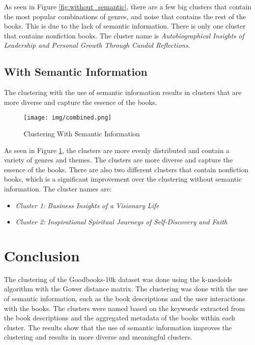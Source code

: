 \documentclass[english]{mvi-report}
\begin{document}
As seen in Figure \ref{fig:without_semantic}, there are a few big clusters that contain the most popular combinations of genres, and noise that contains the rest of the books. This is due to the lack of semantic information.
There is only one cluster that contains nonfiction books. The cluster name is \textit{Autobiographical Insights of Leadership and Personal Growth Through Candid Reflections}.

\newpage
\subsection{With Semantic Information}
The clustering with the use of semantic information results in clusters that are more diverse and capture the essence of the books.

\begin{figure}[H]
    \centering
    \texttt{[image: img/combined.png]}
    \caption{Clustering With Semantic Information}
    \label{fig:with_semantic}
\end{figure}

As seen in Figure \ref{fig:with_semantic}, the clusters are more evenly distributed and contain a variety of genres and themes. The clusters are more diverse and capture the essence of the books. There are also two different clusters that contain nonfiction books, which is a significant improvement over the clustering without semantic information. The cluster names are:

\begin{itemize}
    \item \textit{Cluster 1:} \textit{Business Insights of a Visionary Life}
    \item \textit{Cluster 2:} \textit{Inspirational Spiritual Journeys of Self-Discovery and Faith}
\end{itemize}

\section{Conclusion}
The clustering of the Goodbooks-10k dataset was done using the k-medoids algorithm with the Gower distance matrix. The clustering was done with the use of semantic information, such as the book descriptions and the user interactions with the books. The clusters were named based on the keywords extracted from the book descriptions and the aggregated metadata of the books within each cluster. The results show that the use of semantic information improves the clustering and results in more diverse and meaningful clusters.


\end{document}
